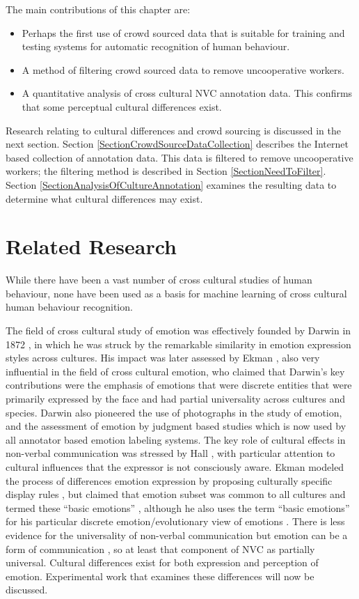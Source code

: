 The main contributions of this chapter are:
\begin{itemize}
 \item Perhaps the first use of crowd sourced data that is suitable for training and testing systems for automatic recognition of human behaviour.
 \item A method of filtering crowd sourced data to remove uncooperative workers.
 \item A quantitative analysis of cross cultural \ac{NVC} annotation data. This confirms that some perceptual cultural differences exist.
\end{itemize}

Research relating to cultural differences and crowd sourcing is discussed in the next section. Section \ref{SectionCrowdSourceDataCollection} describes the Internet based collection of annotation data. This data is filtered to remove uncooperative workers; the filtering method is described in Section \ref{SectionNeedToFilter}. Section \ref{SectionAnalysisOfCultureAnnotation} examines the resulting data to determine what cultural differences may exist.

\section{Related Research}
\label{BackgroundCrossCulture}

While there have been a vast number of cross cultural studies of human behaviour, none have been used as a basis for machine learning of cross cultural human behaviour recognition.

The field of cross cultural study of emotion was effectively founded by Darwin in 1872 \cite{Darwin2002}, in which he was struck by the remarkable similarity in emotion expression styles across cultures. His impact was later assessed by Ekman \cite{Ekman2009}, also very influential in the field of cross cultural emotion, who claimed that Darwin's key contributions were the emphasis of emotions that were discrete entities that were primarily expressed by the face and had partial universality across cultures and species. Darwin also pioneered the use of photographs in the study of emotion, and the assessment of emotion by judgment based studies which is now used by all annotator based emotion labeling systems. The key role of cultural effects in non-verbal communication was stressed by Hall \cite{Hall1959}, with particular attention to cultural influences that the expressor is not consciously aware. Ekman modeled the process of differences emotion expression by proposing culturally specific display rules \cite{Ekman1969}, but claimed that emotion subset was common to all cultures and termed these ``basic emotions'' \cite{Ekman1972}, although he also uses the term ``basic emotions'' for his particular discrete emotion/evolutionary view of emotions \cite{Ekman99}. There is less evidence for the universality of non-verbal communication but emotion can be a form of communication \cite{Frith2009}, so at least that component of \ac{NVC} as partially universal. Cultural differences exist for both expression and perception of emotion. Experimental work that examines these differences will now be discussed.

